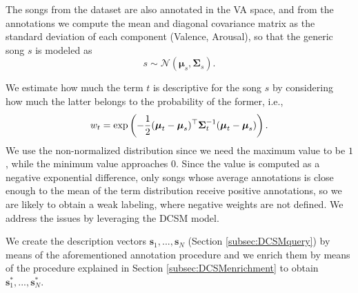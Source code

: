 The songs from the dataset are also annotated in the VA space, and from the annotations we compute the mean and diagonal covariance matrix as the standard deviation of each component (Valence, Arousal), so that the generic song $s$ is modeled as 
\begin{equation}
s \sim \mathcal{N}(\boldsymbol{\mu}_s,\boldsymbol{\Sigma}_s).
\end{equation} 

We estimate how much the term $t$ is descriptive for the song $s$ by considering how much the latter belongs to the probability of the former, i.e.,
\begin{equation}
w_t = \text{exp} \left(-\frac{1}{2} (\boldsymbol{\mu}_t -\boldsymbol{\mu}_s)^\top \boldsymbol{\Sigma}_t^{-1}  (\boldsymbol{\mu}_t -\boldsymbol{\mu}_s) \right).
\end{equation} 
We use the non-normalized distribution since we need the maximum value to be $1$, while the minimum value approaches $0$. Since the value is computed as a negative exponential difference, only songs whose average annotations is close enough to the mean of the term distribution receive positive annotations, so we are likely to obtain a weak labeling, where negative weights are not defined. We address the issues by leveraging the DCSM model.

We create the description vectors  $\mathbf{s}_1, ..., \mathbf{s}_N$ (Section \ref{subsec:DCSMquery}) by means of the aforementioned annotation procedure and we enrich them by means of the procedure explained in Section \ref{subsec:DCSMenrichment} to obtain $\mathbf{s}^*_1, ..., \mathbf{s}^*_N$.


